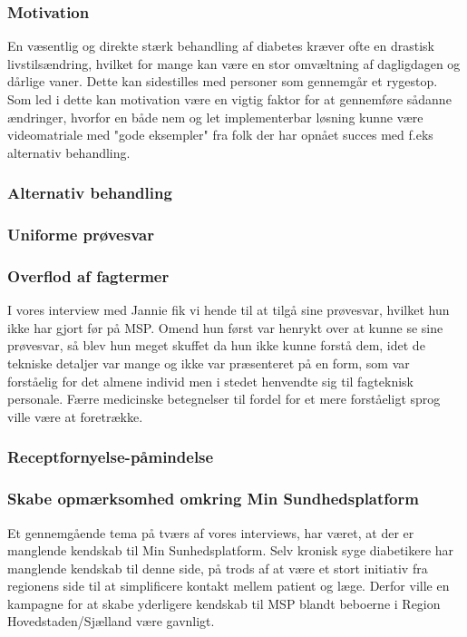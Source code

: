 \subsubsection{Motivation}
En væsentlig og direkte stærk behandling af diabetes kræver ofte en drastisk livstilsændring, hvilket for mange kan være en stor omvæltning af dagligdagen og dårlige vaner. Dette kan sidestilles med personer som gennemgår et rygestop. Som led i dette kan motivation være en vigtig faktor for at gennemføre sådanne ændringer, hvorfor en både nem og let implementerbar løsning kunne være videomatriale med "gode eksempler" fra folk der har opnået succes med f.eks alternativ behandling.

\subsubsection{Alternativ behandling}


\subsubsection{Uniforme prøvesvar}

\subsubsection{Overflod af fagtermer}
I vores interview med Jannie fik vi hende til at tilgå sine prøvesvar, hvilket hun ikke har gjort før på MSP. Omend hun først var henrykt over at kunne se sine prøvesvar, så blev hun meget skuffet da hun ikke kunne forstå dem, idet de tekniske detaljer var mange og ikke var præsenteret på en form, som var forståelig for det almene individ men i stedet henvendte sig til fagteknisk personale. Færre medicinske betegnelser til fordel for et mere forståeligt sprog ville være at foretrække. 

\subsubsection{Receptfornyelse-påmindelse}

\subsubsection{Skabe opmærksomhed omkring Min Sundhedsplatform}
Et gennemgående tema på tværs af vores interviews, har været, at der er manglende kendskab til Min Sunhedsplatform. Selv kronisk syge diabetikere har manglende kendskab til denne side, på trods af at være et stort initiativ fra regionens side til at simplificere kontakt mellem patient og læge. Derfor ville en kampagne for at skabe yderligere kendskab til MSP blandt beboerne i Region Hovedstaden/Sjælland være gavnligt.

